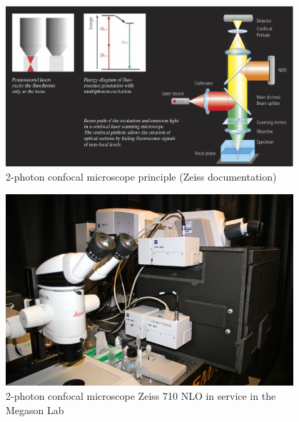 \begin{figure}[htb]
\begin{center}
\leavevmode
 \includegraphics[width=0.95\textwidth]{pictures/ConfocalZeissPrinciple}
\end{center}
\caption{2-photon confocal microscope principle (Zeiss documentation)}
\label{fig:Confocal2photonsPrinciple}
\end{figure}

\begin{figure}[htb]
\begin{center}
\leavevmode
 \includegraphics[width=0.95\textwidth]{pictures/PICmicroscope}
\end{center}
\caption{2-photon confocal microscope Zeiss 710 NLO in service in the Megason
Lab}
\label{fig:MicMegason}
\end{figure}



